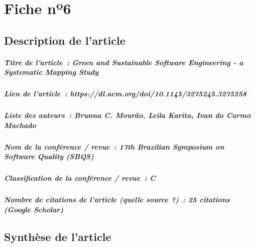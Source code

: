 
\chapter{Fiche nº6} %
\label{app:Fiche6} %

\section{Description de l'article}

\paragraph{Titre de l'article~: \textnormal{Green and Sustainable Software Engineering - a Systematic Mapping Study}}
\paragraph{Lien de l'article~: \textnormal{https://dl.acm.org/doi/10.1145/3275245.3275258}}
\paragraph{Liste des auteurs~: \textnormal{Brunna C. Mourão, Leila Karita, Ivan do Carmo Machado}}
\paragraph{Nom de la conférence / revue~: \textnormal{17th Brazilian Symposium on Software Quality (SBQS)}}
\paragraph{Classification de la conférence / revue~: \textnormal{C}}
\paragraph{Nombre de citations de l'article (quelle source ?)~: \textnormal{25 citations (Google Scholar)}}



\section{Synthèse de l'article}

